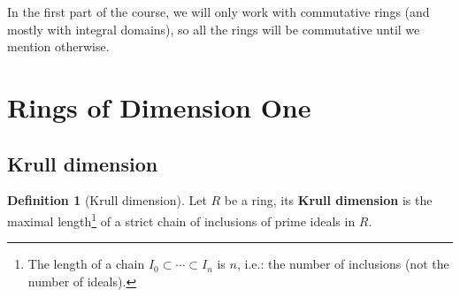 \documentclass{tufte-handout} %
\theoremstyle{definition}
\newtheorem{defn}[thm]{Definition}
\theoremstyle{remark}
\begin{document}
In the first part of the course, we will only work with commutative rings (and mostly with integral domains), so all the rings will be commutative until we mention otherwise.
\section{Rings of Dimension One}
\subsection{Krull dimension}
\begin{defn}[Krull dimension]
	Let $R$ be a ring, its \textbf{Krull dimension} is the maximal length\footnote{The length of a chain $I_0 \subset \cdots \subset I_n$ is $n$, i.e.: the number of inclusions (not the number of ideals).} of a strict chain of inclusions of prime ideals in $R$.
\end{defn}
\end{document}
